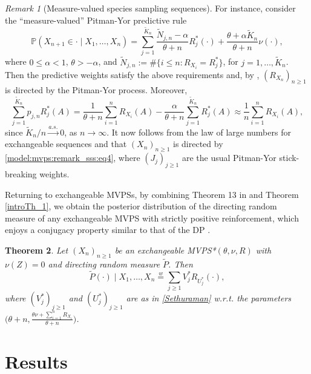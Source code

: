 \documentclass[a4paper]{article}
\theoremstyle{plain}
\newtheorem{theorem}{Theorem}
\theoremstyle{remark}
\newtheorem{remark}[theorem]{Remark}
\theoremstyle{definition}
\begin{document}
\begin{remark}[Measure-valued species sampling sequences]
For instance, consider the ``measure-valued'' Pitman-Yor predictive rule
\[\mathbb{P}(X_{n+1}\in\cdot\mid X_1,\ldots,X_n)=\sum_{j=1}^{\tilde{K}_n}\frac{\tilde{N}_{j,n}-\alpha}{\theta+n}R_j^*(\cdot)+\frac{\theta+\alpha\tilde{K}_n}{\theta+n}\nu(\cdot),\]
where $0\leq\alpha<1$, $\theta>-\alpha$, and $\tilde{N}_{j,n}:=\#\{i\leq n:R_{X_i}=R_j^*\}$, for $j=1,\ldots,\tilde{K}_n$. Then the predictive weights satisfy the above requirements and, by \citet[][Theorem 8]{berti2023kernel}, $(R_{X_n})_{n\geq1}$ is directed by the Pitman-Yor process. Moreover,
\[\sum_{j=1}^{\tilde{K}_n}p_{j,n}R_j^*(A)=\frac{1}{\theta+n}\sum_{i=1}^nR_{X_i}(A)-\frac{\alpha}{\theta+n}\sum_{j=1}^{\tilde{K}_n}R_j^*(A)\approx\frac{1}{n}\sum_{i=1}^nR_{X_i}(A),\]
since $\tilde{K}_n/n\overset{a.s.}{\longrightarrow}0$, as $n\rightarrow\infty$. It now follows from the law of large numbers for exchangeable sequences and \citet[][Theorem 9]{berti2023kernel} that $(X_n)_{n\geq1}$ is directed by \eqref{model:mvps:remark_sss:eq4}, where $(J_j)_{j\geq1}$ are the usual Pitman-Yor stick-breaking weights. 
\end{remark}

Returning to exchangeable MVPSs, by combining Theorem 13 in \cite{berti2023kernel} and Theorem \ref{introTh_1}, we obtain the posterior distribution of the directing random measure of any exchangeable MVPS with strictly positive reinforcement, which enjoys a conjugacy property similar to that of the DP \citep[Theorem 4.6]{ghosal2017}.

\begin{theorem}\label{introTh_3}
Let $(X_n)_{n\geq1}$ be an exchangeable MVPS*$(\theta,\nu,R)$ with $\nu(Z)=0$ and directing random measure $\tilde{P}$. Then
\[\tilde{P}(\cdot)\mid X_1,\ldots,X_n\overset{w}{=}\sum_{j\geq1} V_j^*R_{U_j^*}(\cdot),\]
where $(V_j^*)_{j\geq1}$ and $(U_j^*)_{j\geq1}$ are as in \eqref{Sethuraman} w.r.t. the parameters $\bigl(\theta+n,\frac{\theta\nu+\sum_{i=1}^nR_{X_i}}{\theta+n}\bigr)$.
\end{theorem}

\section{Results}\label{section:results}
\end{document}

